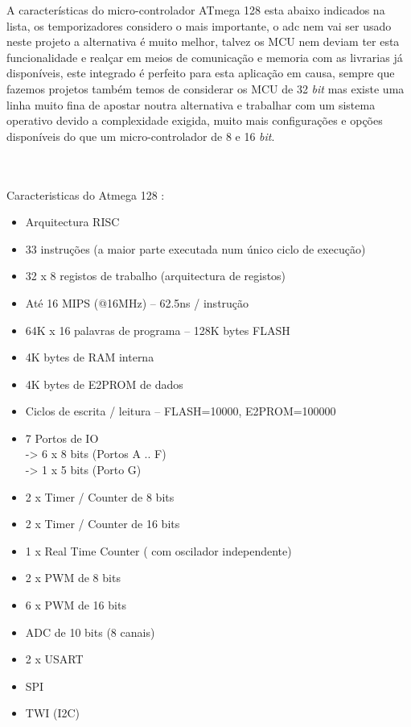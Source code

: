 \newpage
A características do micro-controlador ATmega 128 esta abaixo indicados na lista, os temporizadores considero o mais importante, o \ac{adc} nem vai ser usado neste projeto a alternativa é muito melhor, talvez os MCU nem deviam ter esta funcionalidade e realçar em meios de comunicação e memoria com as livrarias já disponíveis, este integrado é perfeito para esta aplicação em causa, sempre que fazemos projetos também temos de considerar os MCU de 32 \textit{bit} mas existe uma linha muito fina de apostar noutra alternativa e trabalhar com um sistema operativo devido a complexidade exigida, muito mais configurações e opções disponíveis do que um micro-controlador de 8 e 16 \textit{bit}.
\\
\\
\\
\begin{minipage}{\linewidth}
{\Large Caracteristicas do Atmega 128 :}
\begin{itemize}	
	\setlength\itemsep{-0.3em}
	\item Arquitectura RISC
	\item 33 instruções (a maior parte executada num único ciclo de execução)
	\item 32 x 8 registos de trabalho (arquitectura de registos)
	\item Até 16 MIPS (@16MHz) – 62.5ns / instrução
	\item 64K x 16 palavras de programa – 128K bytes FLASH
	\item 4K bytes de RAM interna
	\item 4K bytes de E2PROM de dados
	\item Ciclos de escrita / leitura – FLASH=10000, E2PROM=100000
	\item 7 Portos de IO \\
		\hspace*{.5cm}	-> 6 x 8 bits (Portos A .. F) \\
		\hspace*{.5cm}	-> 1 x 5 bits (Porto G)
	\item 2 x Timer / Counter de 8 bits
	\item 2 x Timer / Counter de 16 bits
	\item 1 x Real Time Counter ( com oscilador independente)
	\item 2 x PWM de 8 bits
	\item 6 x PWM de 16 bits
	\item ADC de 10 bits (8 canais)
	\item 2 x USART
	\item SPI
	\item TWI (I2C)
\end{itemize}
\end{minipage}
